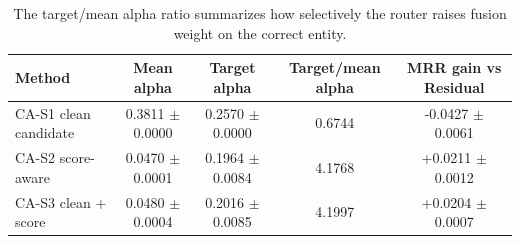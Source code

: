 \begin{table}[t]
\centering
\small
\caption{Overall alpha behavior of candidate-aware full-ranking routers.}
\label{tab:candidate_router_alpha_overall}
\begin{tabular}{p{}cccc}
\toprule
Method & Mean alpha & Target alpha & Target/mean alpha & MRR gain vs Residual \\
\midrule
CA-S1 clean candidate & 0.3811 $\pm$ 0.0000 & 0.2570 $\pm$ 0.0000 & 0.6744 & -0.0427 $\pm$ 0.0061 \\
CA-S2 score-aware & 0.0470 $\pm$ 0.0001 & 0.1964 $\pm$ 0.0084 & 4.1768 & +0.0211 $\pm$ 0.0012 \\
CA-S3 clean + score & 0.0480 $\pm$ 0.0004 & 0.2016 $\pm$ 0.0085 & 4.1997 & +0.0204 $\pm$ 0.0007 \\
\bottomrule
\end{tabular}
\vspace{0.4ex}\caption*{\footnotesize The target/mean alpha ratio summarizes how selectively the router raises fusion weight on the correct entity.}
\end{table}
